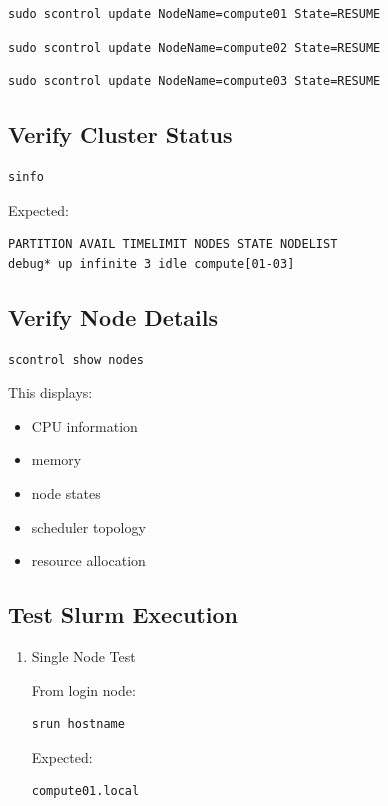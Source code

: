 \documentclass[11pt]{article}
\begin{document}
\begin{verbatim}
sudo scontrol update NodeName=compute01 State=RESUME
\end{verbatim}

\begin{verbatim}
sudo scontrol update NodeName=compute02 State=RESUME
\end{verbatim}

\begin{verbatim}
sudo scontrol update NodeName=compute03 State=RESUME
\end{verbatim}
\subsection{Verify Cluster Status}
\label{sec:org9885070}

\begin{verbatim}
sinfo
\end{verbatim}

Expected:

\begin{verbatim}
PARTITION AVAIL TIMELIMIT NODES STATE NODELIST
debug* up infinite 3 idle compute[01-03]
\end{verbatim}
\subsection{Verify Node Details}
\label{sec:org9a65ef9}

\begin{verbatim}
scontrol show nodes
\end{verbatim}

This displays:

\begin{itemize}
\item CPU information
\item memory
\item node states
\item scheduler topology
\item resource allocation
\end{itemize}
\subsection{Test Slurm Execution}
\label{sec:org9e4c1af}
\begin{enumerate}
\item Single Node Test
\label{sec:org49f0bbc}

From login node:

\begin{verbatim}
srun hostname
\end{verbatim}

Expected:

\begin{verbatim}
compute01.local
\end{verbatim}
\end{enumerate}
\end{document}
